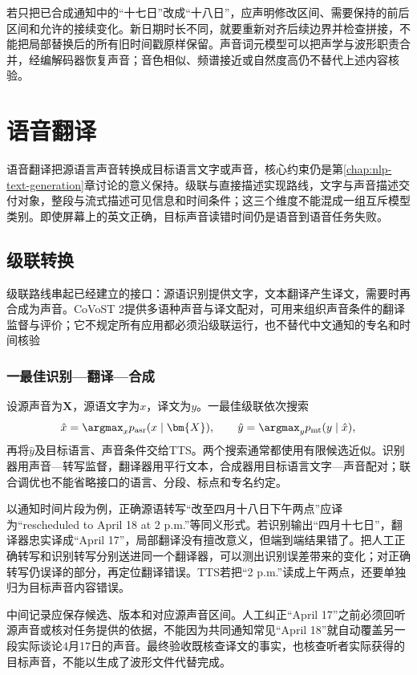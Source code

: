 若只把已合成通知中的“十七日”改成“十八日”，应声明修改区间、需要保持的前后区间和允许的接续变化。新日期时长不同，就要重新对齐后续边界并检查拼接，不能把局部替换后的所有旧时间戳原样保留。声音词元模型可以把声学与波形职责合并，经编解码器恢复声音；音色相似、频谱接近或自然度高仍不替代上述内容核验。

\section{语音翻译}
\label{sec:nlp-speech-translation}

语音翻译把源语言声音转换成目标语言文字或声音，核心约束仍是第\ref{chap:nlp-text-generation}章讨论的意义保持。级联与直接描述实现路线，文字与声音描述交付对象，整段与流式描述可见信息和时间条件；这三个维度不能混成一组互斥模型类别。即使屏幕上的英文正确，目标声音读错时间仍是语音到语音任务失败。

\subsection{级联转换}
\label{sec:nlp-speech-cascade}

级联路线串起已经建立的接口：源语识别提供文字，文本翻译产生译文，需要时再合成为声音。CoVoST 2提供多语种声音与译文配对，可用来组织声音条件的翻译监督与评价；它不规定所有应用都必须沿级联运行，也不替代中文通知的专名和时间核验

\subsubsection{一最佳识别—翻译—合成}
\label{sec:nlp-speech-one-best}

设源声音为$\bm{X}$，源语文字为$x$，译文为$y$。一最佳级联依次搜索
\[
 \hat x=\argmax_x p_{\mathrm{asr}}(x\mid\bm{X}),
 \qquad
 \hat y=\argmax_y p_{\mathrm{mt}}(y\mid\hat x),
\]
再将$\hat y$及目标语言、声音条件交给TTS。两个搜索通常都使用有限候选近似。识别器用声音—转写监督，翻译器用平行文本，合成器用目标语言文字—声音配对；联合调优也不能省略接口的语言、分段、标点和专名约定。

以通知时间片段为例，正确源语转写“改至四月十八日下午两点”应译为“rescheduled to April 18 at 2 p.m.”等同义形式。若识别输出“四月十七日”，翻译器忠实译成“April 17”，局部翻译没有擅改意义，但端到端结果错了。把人工正确转写和识别转写分别送进同一个翻译器，可以测出识别误差带来的变化；对正确转写仍误译的部分，再定位翻译错误。TTS若把“2 p.m.”读成上午两点，还要单独归为目标声音内容错误。

中间记录应保存候选、版本和对应源声音区间。人工纠正“April 17”之前必须回听源声音或核对任务提供的依据，不能因为共同通知常见“April 18”就自动覆盖另一段实际谈论4月17日的声音。最终验收既核查译文的事实，也核查听者实际获得的目标声音，不能以生成了波形文件代替完成。

